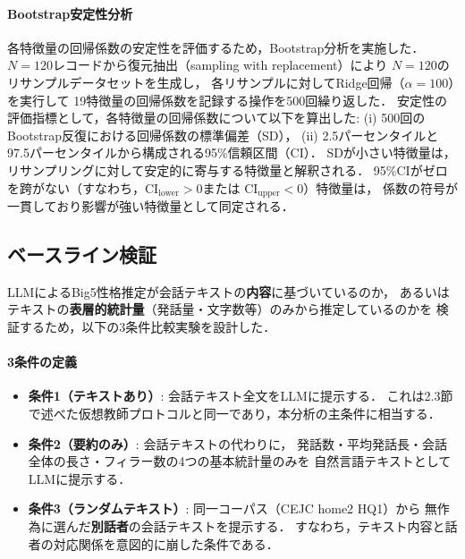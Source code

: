 \documentclass[dvipdfmx,11pt,a4paper]{bxjsarticle}
\begin{document}
\paragraph{Bootstrap安定性分析}
各特徴量の回帰係数の安定性を評価するため，Bootstrap分析を実施した．
$N = 120$レコードから復元抽出（sampling with replacement）により
$N = 120$のリサンプルデータセットを生成し，
各リサンプルに対してRidge回帰（$\alpha = 100$）を実行して
19特徴量の回帰係数を記録する操作を500回繰り返した．
安定性の評価指標として，各特徴量の回帰係数について以下を算出した:
(i) 500回のBootstrap反復における回帰係数の標準偏差（SD），
(ii) 2.5パーセンタイルと97.5パーセンタイルから構成される95\%信頼区間（CI）．
SDが小さい特徴量は，リサンプリングに対して安定的に寄与する特徴量と解釈される．
95\%CIがゼロを跨がない（すなわち，$\text{CI}_{\text{lower}} > 0$または
$\text{CI}_{\text{upper}} < 0$）特徴量は，
係数の符号が一貫しており影響が強い特徴量として同定される．

\subsection{ベースライン検証}
\label{sec:baseline_validation}

LLMによるBig5性格推定が会話テキストの\textbf{内容}に基づいているのか，
あるいはテキストの\textbf{表層的統計量}（発話量・文字数等）のみから推定しているのかを
検証するため，以下の3条件比較実験を設計した．

\paragraph{3条件の定義}
\begin{itemize}
  \item \textbf{条件1（テキストあり）}: 会話テキスト全文をLLMに提示する．
    これは2.3節で述べた仮想教師プロトコルと同一であり，本分析の主条件に相当する．
  \item \textbf{条件2（要約のみ）}: 会話テキストの代わりに，
    発話数・平均発話長・会話全体の長さ・フィラー数の4つの基本統計量のみを
    自然言語テキストとしてLLMに提示する．
  \item \textbf{条件3（ランダムテキスト）}: 同一コーパス（CEJC home2 HQ1）から
    無作為に選んだ\textbf{別話者}の会話テキストを提示する．
    すなわち，テキスト内容と話者の対応関係を意図的に崩した条件である．
\end{itemize}
\end{document}
